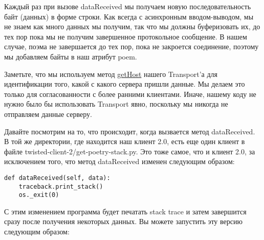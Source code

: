 
Каждый раз при вызове dataReceived мы получаем новую 
последовательность байт (данных) в форме строки. 
Как всегда с асинхронным вводом-выводом, мы не знаем как много данных 
мы получим, так что мы должны буферизовать их, до тех пор пока мы 
не получим завершенное протокольное сообщение. В нашем случае, поэма не 
завершается до тех пор, пока не закроется соединение, поэтому мы 
добавляем байты в наш атрибут poem.



Заметьте, что мы используем метод 
\href{http://twistedmatrix.com/trac/browser/tags/releases/twisted-8.2.0/twisted/internet/interfaces.py#L1341}{getHost} 
нашего Transport'а для идентификации того, какой с какого сервера пришли данные. 
Мы делаем это только для согласованности с более ранними клиентами. 
Иначе, нашему коду не нужно было бы использовать Transport явно, поскольку 
мы никогда не отправляем данные серверу. 



Давайте посмотрим на то, что происходит, когда вызвается метод dataReceived. 
В той же директории, где находится наш клиент 2.0, есть еще один клиент в файле 
twisted-client-2/get-poetry-stack.py. Это тоже самое, что и клиент 2.0, за 
исключением того, что метод dataReceived изменен следующим образом: 

 \begin{verbatim}
def dataReceived(self, data):
    traceback.print_stack()
    os._exit(0)
\end{verbatim} 

С этим изменением программа будет печатать stack trace и затем 
завершится сразу после получения некоторых данных. Вы можете 
запустить эту версию следующим образом:


